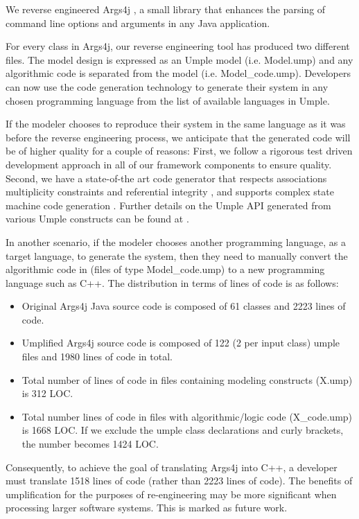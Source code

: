 We reverse engineered Args4j \cite{UmpleFrameworkSANER15p494}, a small library that enhances the parsing of command line options and arguments in any Java application.

For every class in Args4j, our reverse engineering tool has produced two different files. The model design is expressed as an Umple model (i.e. Model.ump) and any algorithmic code is separated from the model (i.e. Model\_code.ump). Developers can now use the code generation technology to generate their system in any chosen programming language from the list of available languages in Umple.

If the modeler chooses to reproduce their system in the same language as it was before the reverse engineering process, we anticipate that the generated code will be of higher quality for a couple of reasons: First, we follow a rigorous test driven development approach in all of our framework components to ensure quality. Second, we have a state-of-the art code generator that respects associations multiplicity constraints and referential integrity \cite{UmpleAssociations}, and supports complex state machine code generation \cite{Badreddin2014EnhancedComposites}. Further details on the Umple API generated from various Umple constructs can be found at \cite{UmpleAPI}.

In another scenario, if the modeler chooses another programming language, as a target language, to generate the system, then they need to manually convert the algorithmic code in (files of type Model\_code.ump) to a new programming language such as C++. The distribution in terms of lines of code is as follows:

\begin{itemize}
\item Original Args4j Java source code is composed of 61 classes and 2223 lines of code.
\item Umplified Args4j source code is composed of 122 (2 per input class) umple files and 1980 lines of code in total.
\item Total number of lines of code in files containing modeling constructs (X.ump) is 312 LOC.
\item Total number lines of code in files with algorithmic/logic code (X\_code.ump) is 1668 LOC. If we exclude the umple class declarations and curly brackets, the number becomes 1424 LOC.
\end{itemize}

Consequently, to achieve the goal of translating Args4j into C++, a developer must translate 1518 lines of code (rather than 2223 lines of code). The benefits of umplification for the purposes of re-engineering may be more significant when processing larger software systems. This is marked as future work.


